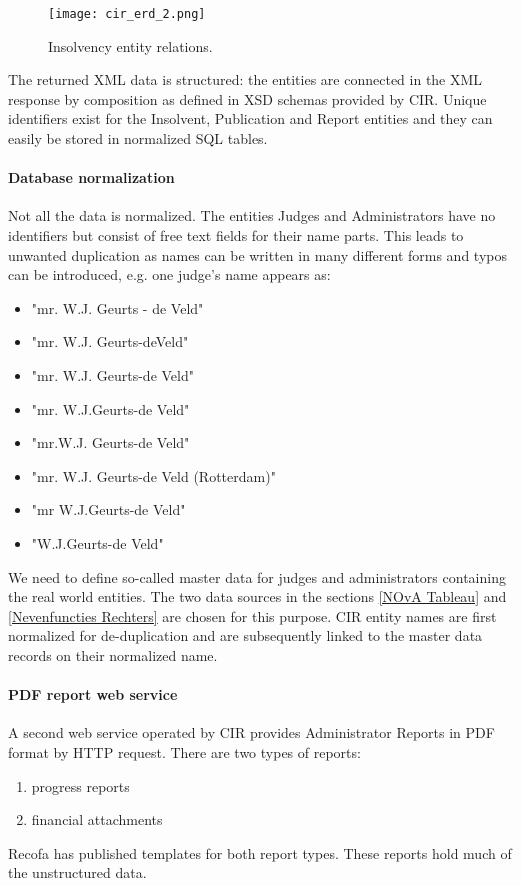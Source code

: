 \begin{figure}[h]
\texttt{[image: cir\_erd\_2.png]}
\caption{Insolvency entity relations.}
\end{figure}

The returned XML data is structured: the entities are connected in the XML response by composition as defined in XSD schemas provided by CIR. Unique identifiers exist for the Insolvent, Publication and Report entities and they can easily be stored in normalized SQL tables. 

\paragraph{Database normalization}
Not all the data is normalized. The entities Judges and Administrators have no identifiers but consist of free text fields for their name parts. This leads to unwanted duplication as names can be written in many different forms and typos can be introduced, e.g. one judge's name appears as:

\begin{itemize}
\item "mr. W.J. Geurts - de Veld"
\item "mr. W.J. Geurts-deVeld"
\item "mr. W.J. Geurts-de Veld"
\item "mr. W.J.Geurts-de Veld"
\item "mr.W.J. Geurts-de Veld"
\item "mr. W.J. Geurts-de Veld (Rotterdam)"
\item "mr W.J.Geurts-de Veld"
\item "W.J.Geurts-de Veld"
\end{itemize}

We need to define so-called master data for judges and administrators containing the real world entities. The two data sources in the sections \ref{NOvA Tableau} and \ref{Nevenfuncties Rechters} are chosen for this purpose. CIR entity names are first normalized for de-duplication and are subsequently linked to the master data records on their normalized name. 

\paragraph{PDF report web service}
A second web service operated by CIR provides Administrator Reports in PDF format by HTTP request. There are two types of reports: 
\begin{enumerate}
\item progress reports
\item financial attachments
\end{enumerate}
Recofa has published templates for both report types\cite{rechtspraak:3}. These reports hold much of the unstructured data.

